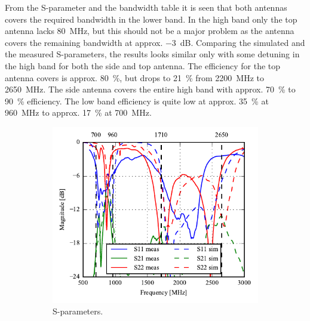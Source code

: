From the S-parameter and the bandwidth table it is seen that both antennas covers the required bandwidth in the lower band. In the high band only the top antenna lacks \SI{80}{MHz}, but this should not be a major problem as the antenna covers the remaining bandwidth at approx. \SI{-3}{dB}. Comparing the simulated and the measured S-parameters, the results looks similar only with some detuning in the high band for both the side and top antenna.
The efficiency for the top antenna covers is approx. \SI{80}{\percent}, but drops to \SI{21}{\percent} from \SI{2200}{MHz} to \SI{2650}{MHz}. The side antenna covers the entire high band with approx. \SI{70}{\percent} to \SI{90}{\percent} efficiency. The low band efficiency is quite low at approx. \SI{35}{\percent} at \SI{960}{MHz} to approx. \SI{17}{\percent} at \SI{700}{MHz}.  
 \begin{figure}[htbp]
    \centering
    \begin{subfigure}{0.49\linewidth}
        \includegraphics{img/tech_sol/nonresonant/prototype/sparams.pdf}
        \caption{S-parameters.}
    \end{subfigure}
    \hfill
    \begin{subfigure}{0.49\linewidth}

\end{subfigure}
\end{figure}

